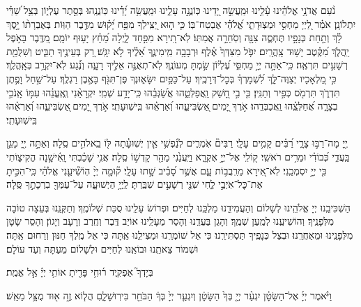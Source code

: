 \documentclass[twoside, openany, parskip=half, 11pt]{book}
\begin{document}
נֹ֨עַם אֲדֹנָ֥י אֱלֹהֵ֗ינוּ עָ֫לֵ֥ינוּ וּמַֽעֲשֵׂ֣ה יָ֭דֵינוּ כּֽוֹנֲנָ֣ה עָלֵ֑ינוּ וּמַֽעֲשֵׂ֥ה יָ֝דֵ֗ינוּ כּֽוֹנֲנֵֽהוּ׃
בְּסֵ֣תֶר עֶלְי֑וֹן בְּצֵ֥ל שַׁ֝דַּ֗י יִתְלוֹנָֽן׃
אֹמַ֗ר לַ֭יְיָ מַחְסִ֣י וּמְצֽוּדָתִ֑י אֱ֝לֹהַ֗י אֶבְטַח־בּֽוֹ׃
כִּ֤י ה֣וּא יַ֭צִּֽילְךָ מִפַּ֥ח יָ֝ק֗וּשׁ מִדֶּ֥בֶר הַוּֽוֹת׃
בְּאֶבְרָת֨וֹ יָ֣סֶךְ לָ֗ךְ וְתַ֣חַת כְּנָפָ֣יו תֶּחְסֶ֑ה צִנָּ֖ה וְסֹֽחֵרָ֣ה אֲמִתּֽוֹ׃
לֹֽא־תִ֭ירָא מִפַּ֣חַד לָ֑יְלָה מֵ֝חֵ֗ץ יָע֥וּף יוֹמָֽם׃
מִ֭דֶּֽבֶר בָּאֹ֣פֶל יַֽהֲלֹ֑ךְ מִ֝קֶּ֗טֶב יָשׁ֥וּד צָֽהֳרָֽיִם׃
יִפֹּ֤ל מִצִּדְּךָ֙ אֶ֗לֶף וּרְבָבָ֥ה מִֽימִינֶ֑ךָ אֵ֝לֶ֗יךָ לֹ֣א יִגָּֽשׁ׃
רַ֭ק בְּעֵינֶ֣יךָ תַבִּ֑יט וְשִׁלֻּמַ֖ת רְשָׁעִ֣ים תִּרְאֶֽה׃
כִּֽי־אַתָּ֣ה יְיָ֣ מַחְסִּ֑י עֶ֝לְי֗וֹן שַׂ֣מְתָּ מְעוֹנֶֽךָ׃
לֹֽא־תְאֻנֶּ֣ה אֵלֶ֣יךָ רָעָ֑ה וְנֶ֗֝גַע לֹֽא־יִקְרַ֥ב בְּאָֽהֳלֶֽךָ׃
כִּ֣י מַ֭לְאָכָיו יְצַוֶּה־לָּ֑ךְ לִ֝שְׁמָרְךָ֗ בְּכׇל־דְּרָכֶֽיךָ׃
עַל־כַּפַּ֥יִם יִשָּׂא֑וּנְךָ פֶּן־תִּגֹּ֖ף בָּאֶ֣בֶן רַגְלֶֽךָ׃
עַל־שַׁ֣חַל וָפֶ֣תֶן תִּדְרֹ֑ךְ תִּרְמֹ֖ס כְּפִ֣יר וְתַנִּֽין׃
כִּ֤י בִ֣י חָ֭שַׁק וַֽאֲפַלְּטֵ֑הוּ אֲשַׂ֝גְּבֵ֗הוּ כִּֽי־יָדַ֥ע שְׁמִֽי׃
יִקְרָאֵ֨נִי וְֽאֶֽעֱנֵ֗הוּ עִמּ֣וֹ אָֽנֹכִ֣י בְצָרָ֑ה אֲ֝חַלְּצֵֽ֗הוּ וַֽאֲכַבְּדֵֽהוּ׃
אֹ֣רֶךְ יָ֭מִים ֖אַשְׂבִּיעֵ֑הוּ וְ֝אַרְאֵ֗הוּ בִּֽישֽׁוּעָתִֽי׃
אֹ֣רֶךְ יָ֭מִים ֖אַשְׂבִּיעֵ֑הוּ וְ֝אַרְאֵ֗הוּ בִּֽישֽׁוּעָתִֽי׃

יְ֖יָ מָה־רַבּ֣וּ צָרָ֑י רַ֝בִּ֗ים קָמִ֥ים עָלָֽי׃ רַבִּים֘ אֹֽמְרִ֢ים לְנַ֫פְשִׁ֥י אֵ֤ין יְשֽׁוּעָ֓תָה לּ֖וֹ בֵֽאלֹהִ֣ים סֶֽלָה׃ וְאַתָּ֣ה יְ֖יָ מָגֵ֥ן בַּֽעֲדִ֑י כְּ֝בוֹדִ֗י וּמֵרִ֥ים רֹאשִֽׁי׃ ק֭וֹלִֽי אֶל־יְיָ֣ אֶקְרָ֑א וַיַּֽעֲנֵ֙נִי מֵהַ֖ר קָדְשׁ֣וֹ סֶֽלָה׃ אֲנִ֥י שָׁכַ֗בְתִּי וָֽאִ֫ישָׁ֥נָה הֱקִיצ֑וֹתִי כִּ֖י יְיָ֣ יִסְמְכֵֽנִי׃ לֹֽא־אִ֭ירָא מֵרִֽבֲב֥וֹת עָ֑ם אֲשֶׁ֥ר סָ֝בִ֗יב שָׁ֣תוּ עָלָֽי׃ ק֘וּמָ֤ה יְיָ֨ הֽוֹשִׁ֘יעֵ֤נִי אֱלֹהַ֗י כִּֽי־הִכִּ֣יתָ אֶת־כׇּל־אֹֽיְבַ֣י לֶ֑חִי שִׁנֵּ֖י רְשָׁעִ֣ים שִׁבַּֽרְתָּ׃ לַֽיְיָ֥ הַיְשׁוּעָ֑ה עַל־עַמְּךָ֖ בִרְכָתֶ֣ךָ סֶּֽלָה׃

הַשְׁכִּיבֵֽנוּ יְיָ אֱלֹהֵֽינוּ לְשָׁלוֹם וְהַעֲמִידֵֽנוּ מַלְכֵּֽנוּ לְחַיִּים׃ וּפְרוֹשׂ עָלֵֽינוּ סֻכַּת שְׁלוֹמֶֽךָ׃ וְתַקְּנֵֽנוּ בְּעֵצָה טוֹבָה מִלְּפָנֶֽיךָ׃ וְהוֹשִׁיעֵֽנוּ לְמַֽעַן שְׁמֶֽךָ׃ וְהָגֵן בַּעֲדֵֽנוּ וְהָסֵר מֵעָלֵֽינוּ אוֹיֵב דֶּֽבֶר וְחֶֽרֶב וְרָעָב וְיָגוֹן׃ וְהָסֵר שָׂטָן מִלְּפָנֵֽינוּ וּמֵאַחֲרֵֽנוּ׃ וּבְצֵל כְּנָפֶֽיךָ תַּסְתִּירֵֽנוּ׃ כִּי אֵל שׁוֹמְרֵֽנוּ וּמַצִּילֵֽנוּ אַֽתָּה כִּי אֵל מֶֽלֶךְ חַנּוּן וְרַחוּם אַֽתָּה׃ וּשְׁמוֹר צֵאתֵֽנוּ וּבוֹאֵֽנוּ לְחַיִּים וּלְשָׁלוֹם מֵעַתָּה וְעַד עוֹלָם׃

בְּיָדְךָ֮ אַפְקִ֢יד ר֫וּחִ֥י פָּדִ֖יתָ אוֹתִ֥י יְיָ֗ אֵ֣ל אֱמֶֽת׃

וַיֹּ֨אמֶר יְיָ֜ אֶל־הַשָּׂטָ֗ן יִגְעַ֨ר יְיָ֤ בְּךָ֙ הַשָּׂטָ֔ן וְיִגְעַ֤ר יְיָ֙ בְּךָ֔ הַבֹּחֵ֖ר בִּירֽוּשָׁלָ֑םִ הֲל֧וֹא זֶ֦ה א֖וּד מֻצָּ֥ל מֵאֵֽשׁ׃
\end{document}
